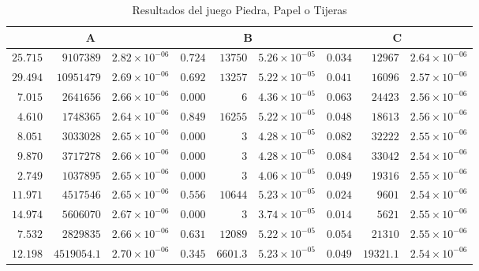 \begin{table}[hbt!]
    \scriptsize
    \centering
    \begin{tabular}{r r r | r r r | r r r}
    \multicolumn{3}{c}{A} & \multicolumn{3}{c}{B} & \multicolumn{3}{c}{C} \\ \hline
    $25.715$ & $9107389$ & $2.82 {\times} 10^{-06}$ & $0.724$ & $13750$ & $5.26 {\times} 10^{-05}$ & $0.034$ & $12967$ & $2.64 {\times} 10^{-06}$ \\
    $29.494$ & $10951479$ & $2.69 {\times} 10^{-06}$ & $0.692$ & $13257$ & $5.22 {\times} 10^{-05}$ & $0.041$ & $16096$ & $2.57 {\times} 10^{-06}$ \\
    $7.015$ & $2641656$ & $2.66 {\times} 10^{-06}$ & $0.000$ & $6$ & $4.36 {\times} 10^{-05}$ & $0.063$ & $24423$ & $2.56 {\times} 10^{-06}$ \\
    $4.610$ & $1748365$ & $2.64 {\times} 10^{-06}$ & $0.849$ & $16255$ & $5.22 {\times} 10^{-05}$ & $0.048$ & $18613$ & $2.56 {\times} 10^{-06}$ \\
    $8.051$ & $3033028$ & $2.65 {\times} 10^{-06}$ & $0.000$ & $3$ & $4.28 {\times} 10^{-05}$ & $0.082$ & $32222$ & $2.55 {\times} 10^{-06}$ \\
    $9.870$ & $3717278$ & $2.66 {\times} 10^{-06}$ & $0.000$ & $3$ & $4.28 {\times} 10^{-05}$ & $0.084$ & $33042$ & $2.54 {\times} 10^{-06}$ \\
    $2.749$ & $1037895$ & $2.65 {\times} 10^{-06}$ & $0.000$ & $3$ & $4.06 {\times} 10^{-05}$ & $0.049$ & $19316$ & $2.55 {\times} 10^{-06}$ \\
    $11.971$ & $4517546$ & $2.65 {\times} 10^{-06}$ & $0.556$ & $10644$ & $5.23 {\times} 10^{-05}$ & $0.024$ & $9601$ & $2.54 {\times} 10^{-06}$ \\
    $14.974$ & $5606070$ & $2.67 {\times} 10^{-06}$ & $0.000$ & $3$ & $3.74 {\times} 10^{-05}$ & $0.014$ & $5621$ & $2.55 {\times} 10^{-06}$ \\
    $7.532$ & $2829835$ & $2.66 {\times} 10^{-06}$ & $0.631$ & $12089$ & $5.22 {\times} 10^{-05}$ & $0.054$ & $21310$ & $2.55 {\times} 10^{-06}$ \\ \hline
    $12.198$ & $4519054.1$ & $2.70 {\times} 10^{-06}$ & $0.345$ & $6601.3$ & $5.23 {\times} 10^{-05}$ & $0.049$ & $19321.1$ & $2.54 {\times} 10^{-06}$ \\ \hline
    \end{tabular}
    \caption{Resultados del juego Piedra, Papel o Tijeras}
    \label{tab:resultados-RPS}
\end{table}

